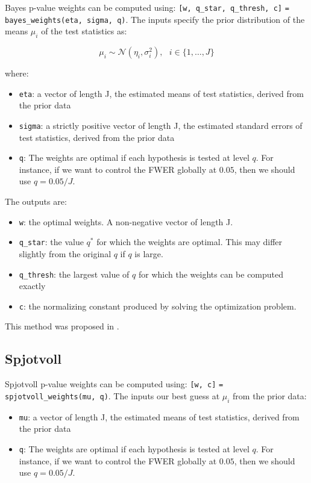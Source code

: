 \documentclass[english,11pt]{article} %
\begin{document}
Bayes p-value weights can be computed using:  \verb+[w, q_star, q_thresh, c]+ \verb+= bayes_weights(eta, sigma, q)+. The inputs specify the prior distribution of the means $\mu_i $ of the test statistics as:

$$\mu_i \sim \mathcal{N}(\eta_i,\sigma_i^2), \mbox{   } i \in \{1,\ldots, J\}$$ 

where:

\begin{itemize}
\item \verb+eta+:  a vector of length J, the estimated means of test statistics, derived from the prior data
\item \verb+sigma+:  a strictly positive vector of length J, the estimated standard errors of test statistics, derived from the prior data
\item \verb+q+: The weights are optimal if each hypothesis is tested at level $q$. For instance, if we want to control the FWER globally at $0.05$, then we should use $q = 0.05/J$.
\end{itemize}

The outputs are: 
\begin{itemize}
\item \verb+w+:  the optimal weights. A non-negative vector of length J.
\item \verb+q_star+: the value $q^*$ for which the weights are optimal. This may differ slightly from the original $q$ if $q$ is large.
\item \verb+q_thresh+: the largest value of $q$ for which the weights can be computed exactly 
\item \verb+c+:  the normalizing constant produced by solving the optimization problem.
\end{itemize}

This method was proposed in \cite{dobriban2015optimal}.

\subsection{Spjotvoll}


Spjotvoll p-value weights can be computed using:  \verb+[w, c]+ \verb+= spjotvoll_weights(mu, q)+. The inputs our best guess at $\mu_i$ from the prior data:

\begin{itemize}
\item \verb+mu+:  a vector of length J, the estimated means of test statistics, derived from the prior data
\item \verb+q+: The weights are optimal if each hypothesis is tested at level $q$. For instance, if we want to control the FWER globally at $0.05$, then we should use $q = 0.05/J$.
\end{itemize}
\end{document}
